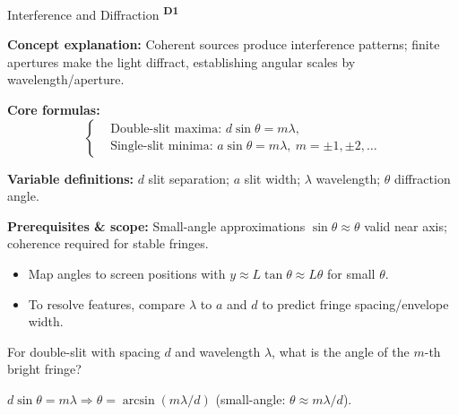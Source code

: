 ﻿\documentclass[12pt,a4paper]{article}
\providecommand{\KPFormulas}{}
\providecommand{\KPHeuristics}{}
\providecommand{\KPProblems}{}
\newcommand{\DOne}{\texorpdfstring{\textsuperscript{\textbf{D1}}}{ D1}}
\begin{document}
\begin{KnowledgePoint}{Interference and Diffraction \DOne}
  \KPFormulas
  \begin{formulabox}
  \textbf{Concept explanation:} Coherent sources produce interference patterns; finite apertures make the light diffract, establishing angular scales by wavelength/aperture.

  \textbf{Core formulas:}
  \[
  \left\{\begin{aligned}
    &\text{Double-slit maxima: } d\sin\theta=m\lambda,\\
    &\text{Single-slit minima: } a\sin\theta=m\lambda,\ m=\pm1,\pm2,\dots
  \end{aligned}\right.
  \]

  \textbf{Variable definitions:} $d$ slit separation; $a$ slit width; $\lambda$ wavelength; $\theta$ diffraction angle.

  \textbf{Prerequisites \& scope:} Small-angle approximations $\sin\theta\approx\theta$ valid near axis; coherence required for stable fringes.
  \end{formulabox}

  \KPHeuristics
  \begin{heuristicsbox}
  \begin{itemize}[leftmargin=*]
    \item Map angles to screen positions with $y\approx L\tan\theta\approx L\theta$ for small $\theta$.
    \item To resolve features, compare $\lambda$ to $a$ and $d$ to predict fringe spacing/envelope width.
  \end{itemize}
  \end{heuristicsbox}

  \KPProblems
  \begin{cheatproblem}
  For double-slit with spacing $d$ and wavelength $\lambda$, what is the angle of the $m$-th bright fringe?
  \begin{solutionbox}
  $d\sin\theta=m\lambda \Rightarrow \theta=\arcsin(m\lambda/d)$ (small-angle: $\theta\approx m\lambda/d$).
  \end{solutionbox}
  \end{cheatproblem}
\end{KnowledgePoint}


\end{document}
